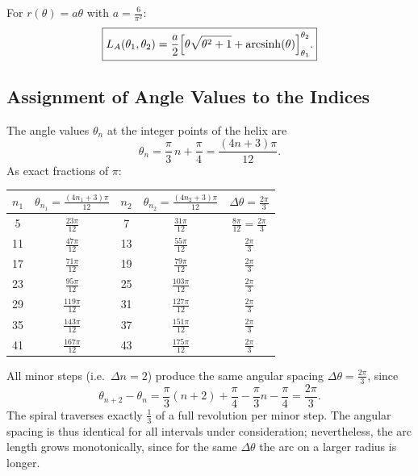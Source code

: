 \begin{theorem}
\label{satz:bogenlaenge_geschlossen}
For $r(\theta) = a\theta$ with $a = \frac{6}{\pi^2}$:
\begin{equation}
\boxed{
L_A(\theta_1, \theta_2)
= \frac{a}{2}\Bigl[\theta\sqrt{\theta^2+1} + \operatorname{arcsinh}(\theta)\Bigr]_{\theta_1}^{\theta_2}.
}
\end{equation}
\end{theorem}

\subsection{Assignment of Angle Values to the Indices}

The angle values $\theta_n$ at the integer points of the helix are
\[
\theta_n = \frac{\pi}{3}\,n + \frac{\pi}{4} = \frac{(4n+3)\pi}{12}.
\]
As exact fractions of $\pi$:

\begin{center}
\begin{tabular}{ccccc}
\toprule
$n_1$ & $\theta_{n_1} = \frac{(4n_1+3)\pi}{12}$ & $n_2$ & $\theta_{n_2} = \frac{(4n_2+3)\pi}{12}$ & $\Delta\theta = \frac{2\pi}{3}$ \\
\midrule
 5 & $\frac{23\pi}{12}$ &  7 & $\frac{31\pi}{12}$ & $\frac{8\pi}{12} = \frac{2\pi}{3}$ \\
11 & $\frac{47\pi}{12}$ & 13 & $\frac{55\pi}{12}$ & $\frac{2\pi}{3}$ \\
17 & $\frac{71\pi}{12}$ & 19 & $\frac{79\pi}{12}$ & $\frac{2\pi}{3}$ \\
23 & $\frac{95\pi}{12}$ & 25 & $\frac{103\pi}{12}$ & $\frac{2\pi}{3}$ \\
29 & $\frac{119\pi}{12}$ & 31 & $\frac{127\pi}{12}$ & $\frac{2\pi}{3}$ \\
35 & $\frac{143\pi}{12}$ & 37 & $\frac{151\pi}{12}$ & $\frac{2\pi}{3}$ \\
41 & $\frac{167\pi}{12}$ & 43 & $\frac{175\pi}{12}$ & $\frac{2\pi}{3}$ \\
\bottomrule
\end{tabular}
\end{center}

\begin{remark}
All minor steps (i.e.\ $\Delta n = 2$) produce the same angular spacing
$\Delta\theta = \frac{2\pi}{3}$, since
\[
  \theta_{n+2} - \theta_n
  = \frac{\pi}{3}(n+2) + \frac{\pi}{4} - \frac{\pi}{3}n - \frac{\pi}{4}
  = \frac{2\pi}{3}.
\]
The spiral traverses exactly $\frac{1}{3}$ of a full revolution per minor step.
The angular spacing is thus identical for all intervals under consideration;
nevertheless, the arc length grows monotonically, since for the same
$\Delta\theta$ the arc on a larger radius is longer.
\end{remark}

